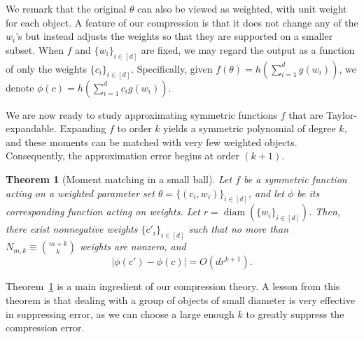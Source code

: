 \documentclass{article}
\theoremstyle{plain}
\newtheorem{theorem}{Theorem}
\def\HYW#1{{\color[HTML]{E97451}[#1]}}
\begin{document}
We remark that the original $\theta$ can also be viewed as weighted, with unit weight for each object. A feature of our compression is that it does not change any of the $w_i$'s but instead adjusts the weights so that they are supported on a smaller subset. When $f$ and $\{w_i\}_{i\in[d]}$ are fixed, we may regard the output as a function of only the weights $\{c_i\}_{i\in[d]}$. Specifically, given $f(\theta) = h (\sum_{i=1}^d g(w_i))$, we denote $\phi(c) = h \left( \sum_{i=1}^{d} c_i g(w_i) \right)$.

We are now ready to study approximating symmetric functions $f$ that are Taylor-expandable. Expanding $f$ to order $k$ yields a symmetric polynomial of degree $k$, and these moments can be matched with very few weighted objects. Consequently, the approximation error begins at order $(k+1)$.



\begin{theorem}[Moment matching in a small ball] \label{thm:moment}
    Let $f$ be a symmetric function acting on a weighted parameter set $\theta = \{(c_i, w_i)\}_{i\in [d]}$, and let $\phi$ be its corresponding function acting on weights. Let $r = \operatorname{diam}(\{w_i\}_{i\in[d]})$. Then, there exist nonnegative weights $\{c'_i\}_{i\in[d]}$ such that no more than $N_{m,k} \equiv \binom{m+k}{k}$ weights are nonzero, and 
    \begin{equation}
        \left| \phi(c') - \phi(c) \right| = O(dr^{k+1}).
    \end{equation}
\end{theorem}

Theorem~\ref{thm:moment} is a main ingredient of our compression theory. A lesson from this theorem is that dealing with a group of objects of small diameter is very effective in suppressing error, as we can choose a large enough $k$ to greatly suppress the compression error. 
\end{document}
